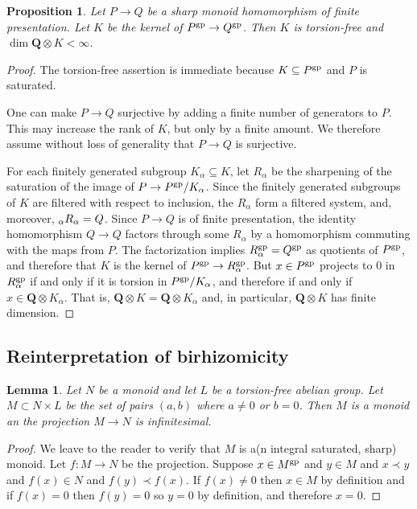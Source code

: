 \documentclass[10pt]{article}
\numberwithin{equation}{section}
\newtheorem{proposition}[paragraph]{Proposition}
\newtheorem{lemma}[paragraph]{Lemma}
\theoremstyle{definition}
\theoremstyle{remark}
\let \varinjlim \relax
\DeclareMathOperator*{\varinjlim}{colim}
\newcommand{\gp}[1]{#1^{\rm gp}}
\begin{document}
\begin{proposition}  \label{prop:27}
	Let $P \to Q$ be a sharp monoid homomorphism of finite presentation.  Let $K$ be the kernel of $P^{\rm gp} \to Q^{\rm gp}$.  Then $K$ is torsion-free and $\dim \mathbf Q \otimes K < \infty$.
\end{proposition}
\begin{proof}
	The torsion-free assertion is immediate because $K \subseteq P^{\rm gp}$ and $P$ is saturated.

	One can make $P \to Q$ surjective by adding a finite number of generators to $P$.  This may increase the rank of $K$, but only by a finite amount.  We therefore assume without loss of generality that $P \to Q$ is surjective.  

	For each finitely generated subgroup $K_\alpha \subseteq K$, let $R_\alpha$ be the sharpening of the saturation of the image of $P \to \gp P / K_\alpha$.  Since the finitely generated subgroups of $K$ are filtered with respect to inclusion, the $R_\alpha$ form a filtered system, and, moreover, $\varinjlim_\alpha R_\alpha = Q$.  
	Since $P \to Q$ is of finite presentation, the identity homomorphism $Q \to Q$ factors through some $R_\alpha$ by a homomorphism commuting with the maps from $P$.  The factorization implies $\gp R_\alpha = \gp Q$ as quotients of $\gp P$, and therefore that $K$ is the kernel of $\gp P \to \gp R_\alpha$.  But $x \in \gp P$ projects to $0$ in $\gp R_\alpha$ if and only if it is torsion in $\gp P / K_\alpha$, and therefore if and only if $x \in \mathbf Q \otimes K_\alpha$.  That is, $\mathbf Q \otimes K = \mathbf Q \otimes K_\alpha$ and, in particular, $\mathbf Q \otimes K$ has finite dimension.
\end{proof}



\subsection{Reinterpretation of birhizomicity}

\begin{lemma} \label{lem:16}
	Let $N$ be a monoid and let $L$ be a torsion-free abelian group.  Let $M \subset N \times L$ be the set of pairs $(a,b)$ where $a \neq 0$ or $b = 0$.  Then $M$ is a monoid an the projection $M \to N$ is infinitesimal.
\end{lemma}
\begin{proof}
	We leave to the reader to verify that $M$ is a(n integral saturated, sharp) monoid.  Let $f : M \to N$ be the projection.  Suppose $x \in \gp M$ and $y \in M$ and $x \prec y$ and $f(x) \in N$ and $f(y) \prec f(x)$.  If $f(x) \neq 0$ then $x \in M$ by definition and if $f(x) = 0$ then $f(y) = 0$ so $y = 0$ by definition, and therefore $x = 0$.
\end{proof}
\end{document}
